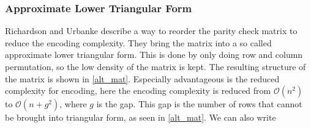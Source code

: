 \subsubsection{Approximate Lower Triangular Form}
Richardson and Urbanke\cite{RiUr01} describe a way to reorder the parity check matrix to reduce the encoding complexity. They bring the matrix into a so called approximate lower triangular form. This is done by only doing row and column permutation, so the low density of the matrix is kept. The resulting structure of the matrix is shown in \cref{alt_mat}. Especially advantageous is the reduced complexity for encoding, here the encoding complexity is reduced from $\mathcal{O}(n^2)$ to $\mathcal{O}(n + g^2)$, where $g$ is the gap. This gap is the number of rows that cannot be brought into triangular form, as seen in \cref{alt_mat}. We can also write
